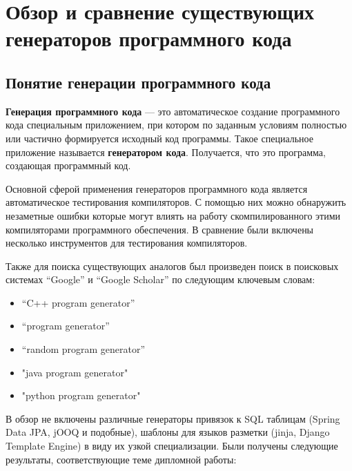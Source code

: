 \section{Обзор и сравнение существующих генераторов программного кода}

\subsection{Понятие генерации программного кода}

\textbf{Генерация программного кода} --- это автоматическое создание программного кода специальным приложением, при котором по заданным условиям полностью или частично формируется исходный код программы. Такое специальное приложение называется \textbf{генератором кода}. Получается, что это программа, создающая программный код.

Основной сферой применения генераторов программного кода является автоматическое тестирования компиляторов. 
С помощью них можно обнаружить незаметные ошибки которые могут влиять на работу скомпилированного этими компиляторами программного обеспечения. В сравнение были включены
несколько инструментов для тестирования компиляторов.

Также для поиска существующих аналогов был произведен поиск в поисковых системах “Google” и “Google Scholar”
по следующим ключевым словам:
\begin{itemize}
    \item “C++ program generator”
    \item “program generator”
    \item “random program generator”
    \item "java program generator"
    \item "python program generator"
\end{itemize}

В обзор не включены различные генераторы привязок к SQL таблицам
(Spring Data JPA, jOOQ и подобные), шаблоны для языков разметки
(jinja, Django Template Engine) в виду их узкой специализации.
Были получены следующие результаты, соответствующие теме дипломной работы:


